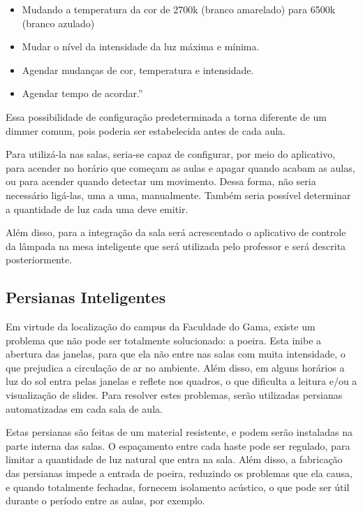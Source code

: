 \begin{itemize}
\item Mudando a temperatura da cor de 2700k (branco amarelado) para 6500k (branco azulado)
\item Mudar	o nível da intensidade da luz máxima e mínima.
\item Agendar mudanças de cor, temperatura e intensidade.
\item Agendar tempo de acordar.” \cite{light2017}
\end{itemize}

Essa possibilidade de configuração predeterminada a torna diferente de um dimmer comum, pois poderia ser estabelecida antes de cada aula.

Para utilizá-la nas salas, seria-se capaz de configurar, por meio do aplicativo, para acender no horário que começam as aulas e apagar quando acabam as aulas, ou para acender quando detectar um movimento. Dessa forma, não seria necessário ligá-las, uma a uma, manualmente. Também seria possível determinar a quantidade de luz cada uma deve emitir.

Além disso, para a integração da sala será acrescentado o aplicativo de controle da lâmpada na mesa inteligente que será utilizada pelo professor e será descrita posteriormente.

\subsection{Persianas Inteligentes}

Em virtude da localização do campus da Faculdade do Gama, existe um problema que não pode ser totalmente solucionado: a poeira. Esta inibe a abertura das janelas, para que ela não entre nas salas com muita intensidade, o que prejudica a circulação de ar no ambiente. Além disso, em alguns horários a luz do sol entra pelas janelas e reflete nos quadros, o que dificulta a leitura e/ou a visualização de slides. Para resolver estes problemas, serão utilizadas persianas automatizadas em cada sala de aula.

Estas persianas são feitas de um material resistente, e podem serão instaladas na parte interna das salas. O espaçamento entre cada haste pode ser regulado, para limitar a quantidade de luz natural que entra na sala. Além disso, a fabricação das persianas impede a entrada de poeira, reduzindo os problemas que ela causa, e quando totalmente fechadas, fornecem isolamento acústico, o que pode ser útil durante o período entre as aulas, por exemplo.

